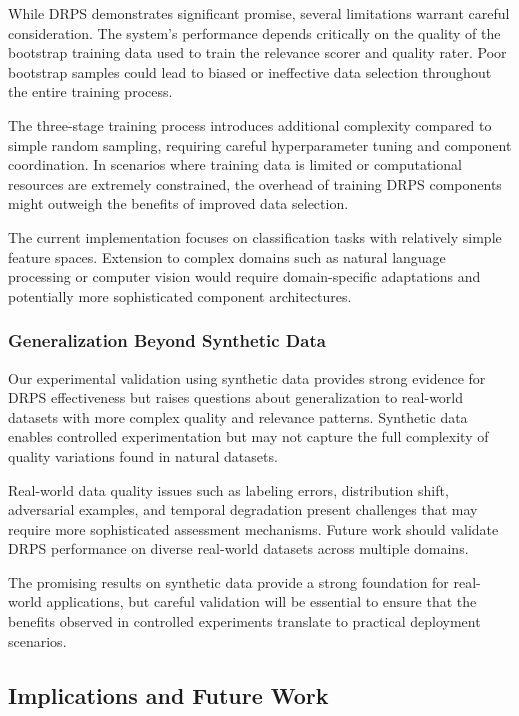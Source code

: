 \documentclass[12pt]{article}
\begin{document}
While DRPS demonstrates significant promise, several limitations warrant careful consideration. The system's performance depends critically on the quality of the bootstrap training data used to train the relevance scorer and quality rater. Poor bootstrap samples could lead to biased or ineffective data selection throughout the entire training process.

The three-stage training process introduces additional complexity compared to simple random sampling, requiring careful hyperparameter tuning and component coordination. In scenarios where training data is limited or computational resources are extremely constrained, the overhead of training DRPS components might outweigh the benefits of improved data selection.

The current implementation focuses on classification tasks with relatively simple feature spaces. Extension to complex domains such as natural language processing or computer vision would require domain-specific adaptations and potentially more sophisticated component architectures.

\subsubsection{Generalization Beyond Synthetic Data}\label{generalization}

Our experimental validation using synthetic data provides strong evidence for DRPS effectiveness but raises questions about generalization to real-world datasets with more complex quality and relevance patterns. Synthetic data enables controlled experimentation but may not capture the full complexity of quality variations found in natural datasets.

Real-world data quality issues such as labeling errors, distribution shift, adversarial examples, and temporal degradation present challenges that may require more sophisticated assessment mechanisms. Future work should validate DRPS performance on diverse real-world datasets across multiple domains.

The promising results on synthetic data provide a strong foundation for real-world applications, but careful validation will be essential to ensure that the benefits observed in controlled experiments translate to practical deployment scenarios.

\subsection{Implications and Future Work}\label{implications}
\end{document}
